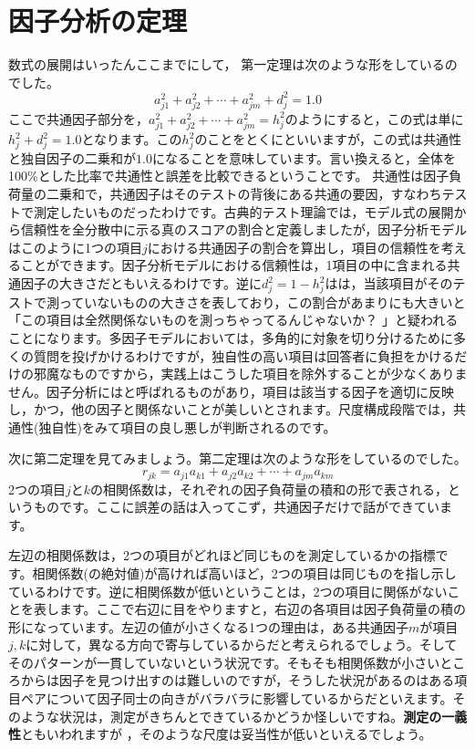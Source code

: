 \documentclass{ltjsbook}
\begin{document}
\section{因子分析の定理}
\label{FactorAnalysisTheorems}
数式の展開はいったんここまでにして，
第一定理は次のような形をしているのでした。
\[a_{j1}^2+a_{j2}^2+ \cdots + a_{jm}^2 + d_j^2 = 1.0 \]
ここで共通因子部分を，$a_{j1}^2+a_{j2}^2+ \cdots + a_{jm}^2=h_j^2$のようにすると，この式は単に$h_j^2 + d_j^2 = 1.0$となります。この$h_j^2$のことをとくにといいますが，この式は共通性と独自因子の二乗和が$1.0$になることを意味しています。言い換えると，全体を100\%とした比率で共通性と誤差を比較できるということです。
共通性は因子負荷量の二乗和で，共通因子はそのテストの背後にある共通の要因，すなわちテストで測定したいものだったわけです。古典的テスト理論では，モデル式の展開から信頼性を全分散中に示る真のスコアの割合と定義しましたが，因子分析モデルはこのように1つの項目$j$における共通因子の割合を算出し，項目の信頼性を考えることができます。因子分析モデルにおける信頼性は，1項目の中に含まれる共通因子の大きさだともいえるわけです。逆に$d_j^2=1-h_j^2$はは，当該項目がそのテストで測っていないものの大きさを表しており，この割合があまりにも大きいと「この項目は全然関係ないものを測っちゃってるんじゃないか？ 」と疑われることになります。多因子モデルにおいては，多角的に対象を切り分けるために多くの質問を投げかけるわけですが，独自性の高い項目は回答者に負担をかけるだけの邪魔なものですから，実践上はこうした項目を除外することが少なくありません。因子分析にはと呼ばれるものがあり，項目は該当する因子を適切に反映し，かつ，他の因子と関係ないことが美しいとされます。尺度構成段階では，共通性(独自性)をみて項目の良し悪しが判断されるのです。

次に第二定理を見てみましょう。第二定理は次のような形をしているのでした。
\[  r_{jk}=a_{j1}a_{k1}+a_{j2}a_{k2}+ \cdots +a_{jm}a_{km} \]
2つの項目$j$と$k$の相関係数は，それぞれの因子負荷量の積和の形で表される，というものです。ここに誤差の話は入ってこず，共通因子だけで話ができています。

左辺の相関係数は，2つの項目がどれほど同じものを測定しているかの指標です。相関係数(の絶対値)が高ければ高いほど，2つの項目は同じものを指し示しているわけです。逆に相関係数が低いということは，2つの項目に関係がないことを表します。ここで右辺に目をやりますと，右辺の各項目は因子負荷量の積の形になっています。左辺の値が小さくなる1つの理由は，ある共通因子$m$が項目$j,k$に対して，異なる方向で寄与しているからだと考えられるでしょう。そしてそのパターンが一貫していないという状況です。そもそも相関係数が小さいところからは因子を見つけ出すのは難しいのですが，そうした状況があるのはある項目ペアについて因子同士の向きがバラバラに影響しているからだといえます。そのような状況は，測定がきちんとできているかどうか怪しいですね。\textbf{測定の一義性}ともいわれますが
，そのような尺度は妥当性が低いといえるでしょう。
\end{document}
